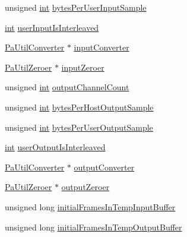 \begin{DoxyCompactItemize}
\item 
unsigned \hyperlink{xmltok_8h_a5a0d4a5641ce434f1d23533f2b2e6653}{int} \hyperlink{struct_pa_util_buffer_processor_aaa4aba8c617b56f63f165e35b28fe393}{bytes\+Per\+User\+Input\+Sample}
\item 
\hyperlink{xmltok_8h_a5a0d4a5641ce434f1d23533f2b2e6653}{int} \hyperlink{struct_pa_util_buffer_processor_a08fb4a5b71ccc3aa1893d8e6c035d192}{user\+Input\+Is\+Interleaved}
\item 
\hyperlink{pa__converters_8h_a4f65f7c2e9e185e7f8caebe85ae9575c}{Pa\+Util\+Converter} $\ast$ \hyperlink{struct_pa_util_buffer_processor_a8bad04b047411362da5a81c38dde04af}{input\+Converter}
\item 
\hyperlink{pa__converters_8h_a6f0dab7cde48b5f41801024ed20be7e7}{Pa\+Util\+Zeroer} $\ast$ \hyperlink{struct_pa_util_buffer_processor_a032b5f8772cc7fe2ec6a43219afdf367}{input\+Zeroer}
\item 
unsigned \hyperlink{xmltok_8h_a5a0d4a5641ce434f1d23533f2b2e6653}{int} \hyperlink{struct_pa_util_buffer_processor_af2c3ba9b0cc5bd8eb2fad8b73b40ad18}{output\+Channel\+Count}
\item 
unsigned \hyperlink{xmltok_8h_a5a0d4a5641ce434f1d23533f2b2e6653}{int} \hyperlink{struct_pa_util_buffer_processor_a8a796dfdfac7c79bfffe8a44e690b358}{bytes\+Per\+Host\+Output\+Sample}
\item 
unsigned \hyperlink{xmltok_8h_a5a0d4a5641ce434f1d23533f2b2e6653}{int} \hyperlink{struct_pa_util_buffer_processor_aa390974cb52943cf40efed34c1daf52b}{bytes\+Per\+User\+Output\+Sample}
\item 
\hyperlink{xmltok_8h_a5a0d4a5641ce434f1d23533f2b2e6653}{int} \hyperlink{struct_pa_util_buffer_processor_a3be95f50566a88ebdc2697cde95d042e}{user\+Output\+Is\+Interleaved}
\item 
\hyperlink{pa__converters_8h_a4f65f7c2e9e185e7f8caebe85ae9575c}{Pa\+Util\+Converter} $\ast$ \hyperlink{struct_pa_util_buffer_processor_ac6a539ab66c9a4a71d8603e7ed7394ad}{output\+Converter}
\item 
\hyperlink{pa__converters_8h_a6f0dab7cde48b5f41801024ed20be7e7}{Pa\+Util\+Zeroer} $\ast$ \hyperlink{struct_pa_util_buffer_processor_a25fadc2a2170fbd7c8ca85b06860ca3c}{output\+Zeroer}
\item 
unsigned long \hyperlink{struct_pa_util_buffer_processor_a4deddc94ba71c17171e8ae823b89e832}{initial\+Frames\+In\+Temp\+Input\+Buffer}
\item 
unsigned long \hyperlink{struct_pa_util_buffer_processor_aec8e9dfce47109ff1f1d8cfa3c411c74}{initial\+Frames\+In\+Temp\+Output\+Buffer}

\end{DoxyCompactItemize}
